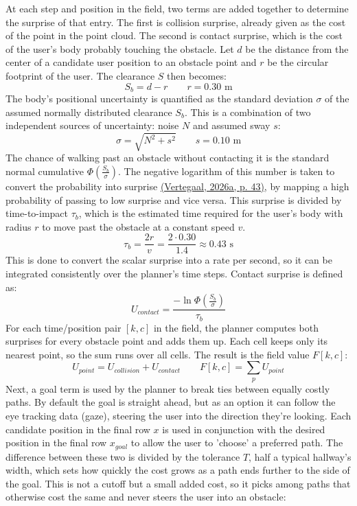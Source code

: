 \documentclass[a4paper]{article}
\begin{document}
At each step and position in the field, two terms are added together to determine the surprise of that entry. The first is collision surprise, already given as the cost of the point in the point cloud. The second is contact surprise, which is the cost of the user's body probably touching the obstacle. Let $d$ be the distance from the center of a candidate user position to an obstacle point and $r$ be the circular footprint of the user. The clearance $S$ then becomes:
$$
S_{b} = d - r \qquad r=0.30 \text{ m}
$$
The body's positional uncertainty is quantified as the standard deviation $\sigma$ of the assumed normally distributed clearance $S_{b}$. This is a combination of two independent sources of uncertainty: noise $N$ and assumed sway $s$:
$$
\sigma = \sqrt{ N^2 + s^2 } \qquad s=0.10 \text{ m}
$$
The chance of walking past an obstacle without contacting it is the standard normal cumulative $\Phi\left( \frac{S_{b}}{\sigma} \right)$. The negative logarithm of this number is taken to convert the probability into surprise \hyperref[references]{(Vertegaal, 2026a, p. 43)}, by mapping a high probability of passing to low surprise and vice versa. This surprise is divided by time-to-impact $\tau_{b}$, which is the estimated time required for the user's body with radius $r$ to move past the obstacle at a constant speed $v$.
$$
\tau_{b}=\frac{2r}{v}=\frac{2\cdot 0.30}{1.4}\approx 0.43\text{ s}
$$
This is done to convert the scalar surprise into a rate per second, so it can be integrated consistently over the planner's time steps. Contact surprise is defined as:
$$
U_{contact}=\frac{-\ln \Phi\left( \frac{S_{b}}{\sigma} \right)}{\tau_{b}}
$$
For each time/position pair $[k,c]$ in the field, the planner computes both surprises for every obstacle point and adds them up. Each cell keeps only its nearest point, so the sum runs over all cells. The result is the field value $F[k,c]$:
$$
U_{point} = U_{collision} + U_{contact}
\qquad
F[k,c] = \sum_{p} U_{point}
$$
Next, a goal term is used by the planner to break ties between equally costly paths. By default the goal is straight ahead, but as an option it can follow the eye tracking data (gaze), steering the user into the direction they're looking. Each candidate position in the final row $x$ is used in conjunction with the desired position in the final row $x_{goal}$  to allow the user to 'choose' a preferred path. The difference between these two is divided by the tolerance $T$, half a typical hallway's width, which sets how quickly the cost grows as a path ends further to the side of the goal. This is not a cutoff but a small added cost, so it picks among paths that otherwise cost the same and never steers the user into an obstacle:
\end{document}
